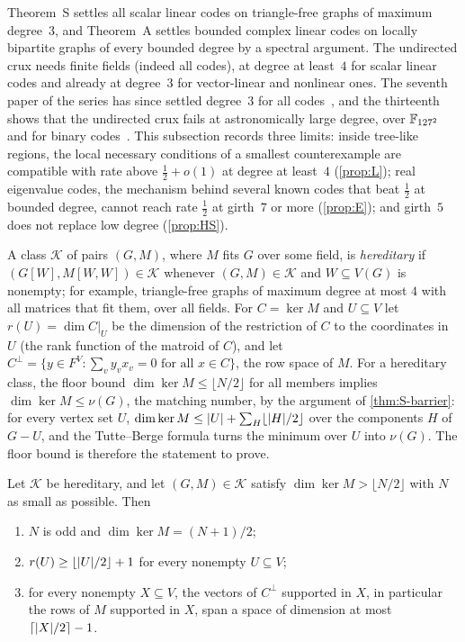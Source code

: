 Theorem~S settles all scalar linear codes on triangle-free graphs of maximum degree~$3$, and Theorem~A settles bounded
complex linear codes on locally bipartite graphs of every bounded degree by a spectral argument. The undirected crux needs finite
fields (indeed all codes), at degree at least~$4$ for scalar linear codes and already at degree~$3$ for vector-linear
and nonlinear ones. The seventh paper of the series has since settled degree~$3$ for all
codes~\cite[Theorem~N3]{NestedElimination2026}, and the thirteenth shows that the undirected crux fails at
astronomically large degree, over $\mathbb{F}_{127^2}$ and for binary codes~\cite[Corollary~U]{StorageCodes2026}. This subsection
records three limits: inside tree-like regions, the local necessary conditions of a smallest counterexample are
compatible with rate above $\frac12+o(1)$ at degree at least~$4$ (\cref{prop:L}); real eigenvalue codes, the mechanism
behind several known codes that beat $\frac12$ at bounded degree, cannot reach rate $\frac12$ at girth~$7$ or more
(\cref{prop:E}); and girth~$5$ does not replace low degree (\cref{prop:HS}).

A class $\mathcal K$ of pairs $(G,M)$, where $M$ fits $G$ over some field, is \emph{hereditary} if
$(G[W],M[W,W])\in\mathcal K$ whenever $(G,M)\in\mathcal K$ and $W\subseteq V(G)$ is nonempty; for example, triangle-free
graphs of maximum degree at most $4$ with all matrices that fit them, over all fields. For $C=\ker M$ and
$U\subseteq V$ let $r(U)=\dim C|_U$ be the dimension of the restriction of $C$ to the coordinates in $U$ (the rank
function of the matroid of $C$), and let $C^\perp=\{y\in F^V:\sum_vy_vx_v=0\text{ for all }x\in C\}$, the row space of
$M$. For a hereditary class, the floor bound $\dim\ker M\le\lfloor N/2\rfloor$ for all
members implies $\dim\ker M\le\nu(G)$, the matching number, by the argument of \cref{thm:S-barrier}: for every vertex
set $U$, $\dim\ker M\le\lvert U \rvert+\sum_H\lfloor\lvert H \rvert/2\rfloor$ over the components $H$ of $G-U$, and the Tutte--Berge
formula turns the minimum over $U$ into $\nu(G)$. The floor bound is therefore the statement to prove.

\begin{lemma}\label{lem:ana-mincex}
\notformalized
Let $\mathcal K$ be hereditary, and let $(G,M)\in\mathcal K$ satisfy $\dim\ker M>\lfloor N/2\rfloor$ with $N$ as small as
possible. Then
\begin{enumerate}[label=(\alph*)]
\item $N$ is odd and $\dim\ker M=(N+1)/2$;
\item $r(U)\ge\lfloor\lvert U \rvert/2\rfloor+1$ for every nonempty $U\subseteq V$;
\item for every nonempty $X\subseteq V$, the vectors of $C^\perp$ supported in $X$, in particular the rows of $M$
  supported in $X$, span a space of dimension at most $\lceil\lvert X \rvert/2\rceil-1$.
\end{enumerate}
\end{lemma}

